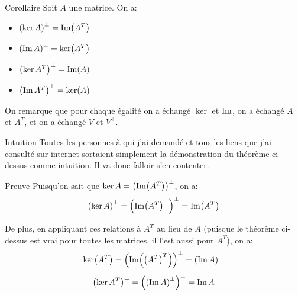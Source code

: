 \documentclass[a4paper]{article}
\begin{document}
\begin{parag}{Corollaire}
    Soit $A$ une matrice. On a:
    \begin{itemize}
        \item $\left(\ker A\right)^{\perp} = \im\left(A^T\right)$
        \item $\left(\im A\right)^\perp = \ker\left(A^T\right)$
        \item $\left(\ker A^T\right)^\perp = \im\left(A\right)$
        \item $\left(\im A^T\right)^{\perp} = \ker\left(A\right)$
    \end{itemize}

    On remarque que pour chaque égalité on a échangé $\ker$ et $\operatorname{Im}$, on a échangé $A$ et $A^T$, et on a échangé $V$ et $V^\perp$.

    \begin{subparag}{Intuition}
        Toutes les personnes à qui j'ai demandé et tous les liens que j'ai consulté sur internet sortaient simplement la démonstration du théorème ci-dessus comme intuition. Il va donc falloir s'en contenter.
    \end{subparag}

    \begin{subparag}{Preuve}
        Puisqu'on sait que $\ker A = \left(\im\left(A^T\right)\right)^\perp$, on a:
        \[\left(\ker A\right)^\perp = \left(\im\left(A^T\right)^\perp\right)^\perp = \im\left(A^T\right)\]

        De plus, en appliquant ces relations à $A^T$ au lieu de $A$ (puisque le théorème ci-dessus est vrai pour toutes les matrices, il l'est aussi pour $A^T$), on a:
        \[\ker\left(A^T\right) = \left(\im\left(\left(A^T\right)^T\right)\right)^\perp = \left(\im A\right)^\perp\]
    \[\left(\ker A^T\right)^\perp = \left(\left(\im A\right)^\perp\right)^{\perp} = \im A\]
    \end{subparag}

\end{parag}
\end{document}
